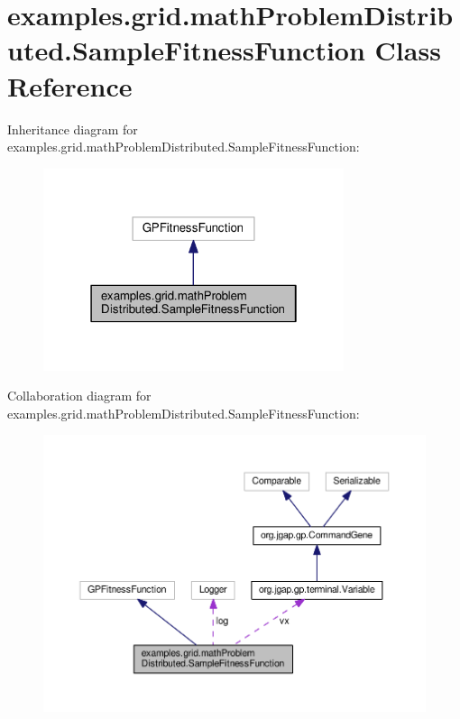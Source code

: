\hypertarget{classexamples_1_1grid_1_1math_problem_distributed_1_1_sample_fitness_function}{\section{examples.\-grid.\-math\-Problem\-Distributed.\-Sample\-Fitness\-Function Class Reference}
\label{classexamples_1_1grid_1_1math_problem_distributed_1_1_sample_fitness_function}
}


Inheritance diagram for examples.\-grid.\-math\-Problem\-Distributed.\-Sample\-Fitness\-Function\-:
\nopagebreak
\begin{figure}[H]
\begin{center}
\leavevmode
\includegraphics[width=250pt]{classexamples_1_1grid_1_1math_problem_distributed_1_1_sample_fitness_function__inherit__graph}
\end{center}
\end{figure}


Collaboration diagram for examples.\-grid.\-math\-Problem\-Distributed.\-Sample\-Fitness\-Function\-:
\nopagebreak
\begin{figure}[H]
\begin{center}
\leavevmode
\includegraphics[width=350pt]{classexamples_1_1grid_1_1math_problem_distributed_1_1_sample_fitness_function__coll__graph}
\end{center}
\end{figure}
